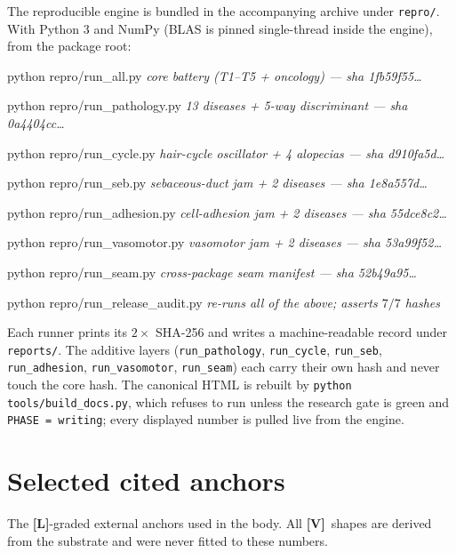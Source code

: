 \documentclass[11pt,a4paper]{article}
\newcommand{\V}{\textcolor{gV}{\textbf{[V]}}}
\newcommand{\Lg}{\textcolor{gL}{\textbf{[L]}}}
\begin{document}
The reproducible engine is bundled in the accompanying archive under \texttt{repro/}. With Python 3 and NumPy
(BLAS is pinned single-thread inside the engine), from the package root:

\begingroup\small\ttfamily
\setlength{\parskip}{0.1em}
python repro/run\_all.py \hfill \rmfamily\itshape core battery (T1--T5 + oncology) --- sha 1fb59f55\dots\par
python repro/run\_pathology.py \hfill \rmfamily\itshape 13 diseases + 5-way discriminant --- sha 0a4404cc\dots\par
python repro/run\_cycle.py \hfill \rmfamily\itshape hair-cycle oscillator + 4 alopecias --- sha d910fa5d\dots\par
python repro/run\_seb.py \hfill \rmfamily\itshape sebaceous-duct jam + 2 diseases --- sha 1e8a557d\dots\par
python repro/run\_adhesion.py \hfill \rmfamily\itshape cell-adhesion jam + 2 diseases --- sha 55dce8c2\dots\par
python repro/run\_vasomotor.py \hfill \rmfamily\itshape vasomotor jam + 2 diseases --- sha 53a99f52\dots\par
python repro/run\_seam.py \hfill \rmfamily\itshape cross-package seam manifest --- sha 52b49a95\dots\par
python repro/run\_release\_audit.py \hfill \rmfamily\itshape re-runs all of the above; asserts $7/7$ hashes\par
\endgroup

\medskip
\begin{sloppypar}
Each runner prints its $2\times$ SHA-256 and writes a machine-readable record under \texttt{reports/}. The
additive layers (\texttt{run\_pathology}, \texttt{run\_cycle}, \texttt{run\_seb}, \texttt{run\_adhesion},
\texttt{run\_vasomotor}, \texttt{run\_seam}) each carry their own hash and never touch the core hash. The canonical
HTML is rebuilt by \texttt{python tools/build\_docs.py}, which refuses to run unless the research gate is green and
\texttt{PHASE = writing}; every displayed number is pulled live from the engine.
\end{sloppypar}

\section*{Selected cited anchors}
\small

The \Lg-graded external anchors used in the body. All \V\ shapes are derived from the substrate and were never
fitted to these numbers.
\end{document}

